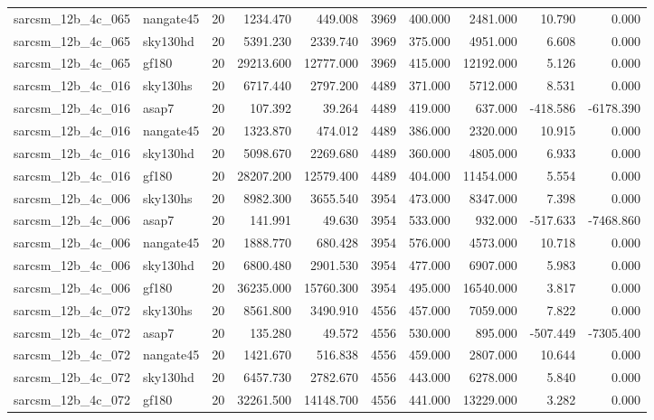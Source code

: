 \begin{longtable}{llrrrrrrrr}
sarcsm\_12b\_4c\_065 & nangate45 & 20 & 1234.470 & 449.008 & 3969 & 400.000 & 2481.000 & 10.790 & 0.000 \\
sarcsm\_12b\_4c\_065 & sky130hd & 20 & 5391.230 & 2339.740 & 3969 & 375.000 & 4951.000 & 6.608 & 0.000 \\
sarcsm\_12b\_4c\_065 & gf180 & 20 & 29213.600 & 12777.000 & 3969 & 415.000 & 12192.000 & 5.126 & 0.000 \\
sarcsm\_12b\_4c\_016 & sky130hs & 20 & 6717.440 & 2797.200 & 4489 & 371.000 & 5712.000 & 8.531 & 0.000 \\
sarcsm\_12b\_4c\_016 & asap7 & 20 & 107.392 & 39.264 & 4489 & 419.000 & 637.000 & -418.586 & -6178.390 \\
sarcsm\_12b\_4c\_016 & nangate45 & 20 & 1323.870 & 474.012 & 4489 & 386.000 & 2320.000 & 10.915 & 0.000 \\
sarcsm\_12b\_4c\_016 & sky130hd & 20 & 5098.670 & 2269.680 & 4489 & 360.000 & 4805.000 & 6.933 & 0.000 \\
sarcsm\_12b\_4c\_016 & gf180 & 20 & 28207.200 & 12579.400 & 4489 & 404.000 & 11454.000 & 5.554 & 0.000 \\
sarcsm\_12b\_4c\_006 & sky130hs & 20 & 8982.300 & 3655.540 & 3954 & 473.000 & 8347.000 & 7.398 & 0.000 \\
sarcsm\_12b\_4c\_006 & asap7 & 20 & 141.991 & 49.630 & 3954 & 533.000 & 932.000 & -517.633 & -7468.860 \\
sarcsm\_12b\_4c\_006 & nangate45 & 20 & 1888.770 & 680.428 & 3954 & 576.000 & 4573.000 & 10.718 & 0.000 \\
sarcsm\_12b\_4c\_006 & sky130hd & 20 & 6800.480 & 2901.530 & 3954 & 477.000 & 6907.000 & 5.983 & 0.000 \\
sarcsm\_12b\_4c\_006 & gf180 & 20 & 36235.000 & 15760.300 & 3954 & 495.000 & 16540.000 & 3.817 & 0.000 \\
sarcsm\_12b\_4c\_072 & sky130hs & 20 & 8561.800 & 3490.910 & 4556 & 457.000 & 7059.000 & 7.822 & 0.000 \\
sarcsm\_12b\_4c\_072 & asap7 & 20 & 135.280 & 49.572 & 4556 & 530.000 & 895.000 & -507.449 & -7305.400 \\
sarcsm\_12b\_4c\_072 & nangate45 & 20 & 1421.670 & 516.838 & 4556 & 459.000 & 2807.000 & 10.644 & 0.000 \\
sarcsm\_12b\_4c\_072 & sky130hd & 20 & 6457.730 & 2782.670 & 4556 & 443.000 & 6278.000 & 5.840 & 0.000 \\
sarcsm\_12b\_4c\_072 & gf180 & 20 & 32261.500 & 14148.700 & 4556 & 441.000 & 13229.000 & 3.282 & 0.000 \\

\end{longtable}
